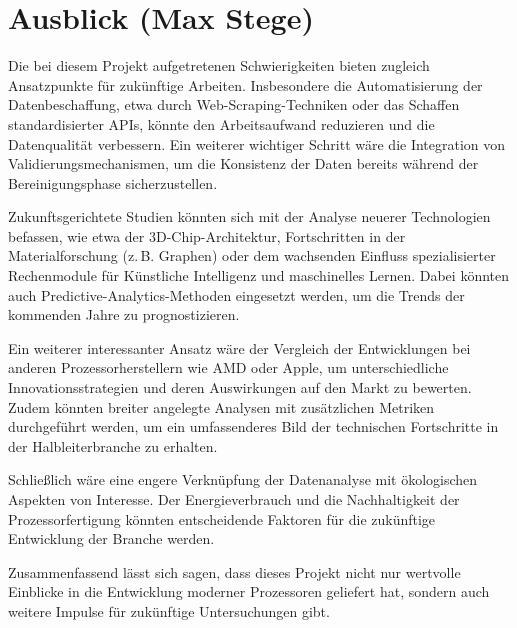 \section{Ausblick (Max Stege)}

Die bei diesem Projekt aufgetretenen Schwierigkeiten bieten zugleich Ansatzpunkte für zukünftige Arbeiten. Insbesondere die Automatisierung der Datenbeschaffung, etwa durch Web-Scraping-Techniken oder das Schaffen standardisierter APIs, könnte den Arbeitsaufwand reduzieren und die Datenqualität verbessern. Ein weiterer wichtiger Schritt wäre die Integration von Validierungsmechanismen, um die Konsistenz der Daten bereits während der Bereinigungsphase sicherzustellen.

Zukunftsgerichtete Studien könnten sich mit der Analyse neuerer Technologien befassen, wie etwa der 3D-Chip-Architektur, Fortschritten in der Materialforschung (z.\,B. Graphen) oder dem wachsenden Einfluss spezialisierter Rechenmodule für Künstliche Intelligenz und maschinelles Lernen. Dabei könnten auch Predictive-Analytics-Methoden eingesetzt werden, um die Trends der kommenden Jahre zu prognostizieren.

Ein weiterer interessanter Ansatz wäre der Vergleich der Entwicklungen bei anderen Prozessorherstellern wie AMD oder Apple, um unterschiedliche Innovationsstrategien und deren Auswirkungen auf den Markt zu bewerten. Zudem könnten breiter angelegte Analysen mit zusätzlichen Metriken durchgeführt werden, um ein umfassenderes Bild der technischen Fortschritte in der Halbleiterbranche zu erhalten.

Schließlich wäre eine engere Verknüpfung der Datenanalyse mit ökologischen Aspekten von Interesse. Der Energieverbrauch und die Nachhaltigkeit der Prozessorfertigung könnten entscheidende Faktoren für die zukünftige Entwicklung der Branche werden.

Zusammenfassend lässt sich sagen, dass dieses Projekt nicht nur wertvolle Einblicke in die Entwicklung moderner Prozessoren geliefert hat, sondern auch weitere Impulse für zukünftige Untersuchungen gibt. 


